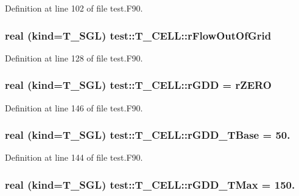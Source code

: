 Definition at line 102 of file test.F90.

\hypertarget{typetest_1_1_t___c_e_l_l_a78d94efd2cbe0a9b6bbb3d041d6882f7}{
\subsubsection[{rFlowOutOfGrid}]{\setlength{\rightskip}{0pt plus 5cm}real (kind={\bf T\_\-SGL}) {\bf test::T\_\-CELL::rFlowOutOfGrid}}}
\label{typetest_1_1_t___c_e_l_l_a78d94efd2cbe0a9b6bbb3d041d6882f7}


Definition at line 128 of file test.F90.

\hypertarget{typetest_1_1_t___c_e_l_l_add653d728642f8eb62103fbe816016bd}{
\subsubsection[{rGDD}]{\setlength{\rightskip}{0pt plus 5cm}real (kind={\bf T\_\-SGL}) {\bf test::T\_\-CELL::rGDD} = {\bf rZERO}}}
\label{typetest_1_1_t___c_e_l_l_add653d728642f8eb62103fbe816016bd}


Definition at line 146 of file test.F90.

\hypertarget{typetest_1_1_t___c_e_l_l_a9fd25fac13ae62f555eb399cb06937f4}{
\subsubsection[{rGDD\_\-TBase}]{\setlength{\rightskip}{0pt plus 5cm}real (kind={\bf T\_\-SGL}) {\bf test::T\_\-CELL::rGDD\_\-TBase} = 50.}}
\label{typetest_1_1_t___c_e_l_l_a9fd25fac13ae62f555eb399cb06937f4}


Definition at line 144 of file test.F90.

\hypertarget{typetest_1_1_t___c_e_l_l_a3ab38a415a3d42b599c6a2002f412cec}{
\subsubsection[{rGDD\_\-TMax}]{\setlength{\rightskip}{0pt plus 5cm}real (kind={\bf T\_\-SGL}) {\bf test::T\_\-CELL::rGDD\_\-TMax} = 150.}}
\label{typetest_1_1_t___c_e_l_l_a3ab38a415a3d42b599c6a2002f412cec}


